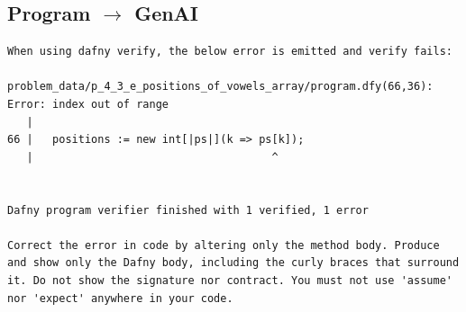 \documentclass{article}
\begin{document}
\subsection*{Program $\rightarrow$ GenAI}
\begin{lstlisting}
When using dafny verify, the below error is emitted and verify fails:

problem_data/p_4_3_e_positions_of_vowels_array/program.dfy(66,36): Error: index out of range
   |
66 |   positions := new int[|ps|](k => ps[k]);
   |                                     ^


Dafny program verifier finished with 1 verified, 1 error

Correct the error in code by altering only the method body. Produce and show only the Dafny body, including the curly braces that surround it. Do not show the signature nor contract. You must not use 'assume' nor 'expect' anywhere in your code.
\end{lstlisting}
\end{document}
